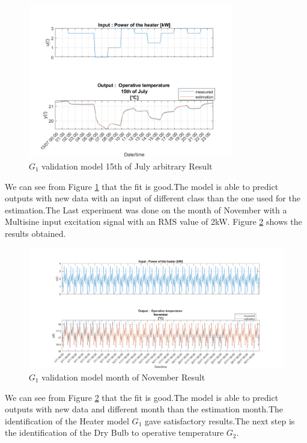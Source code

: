 \documentclass[a4paper,12pt]{report}
\numberwithin{equation}{section}
\begin{document}
\begin{figure}[H]
    \includegraphics[scale=0.8,width=0.8\textwidth]{G1_15_07_RanIn.png}
    \centering
    \caption{$G_{1}$ validation model 15th of July arbitrary Result}
    \label{fig:G1onedayValidation15/07Ran}
\end{figure}

\noindent
We can see from Figure \ref{fig:G1onedayValidation15/07Ran} that the fit is good.The model is able to predict outputs with new data with an input of different class than the one used for the estimation.The Last experiment was  done on the month of November with a Multisine input excitation signal with an RMS value of 2kW. Figure \ref{fig:G1onedayValidationNov} shows the results obtained.

\begin{figure}[H]
    \includegraphics[width=\textwidth]{G1_val_NOV.png}
    \centering
    \caption{$G_{1}$ validation model month of November  Result}
    \label{fig:G1onedayValidationNov}
\end{figure}

\noindent
We can see from Figure \ref{fig:G1onedayValidationNov} that the fit is good.The model is able to predict outputs with new data and different month than the estimation month.The identification of the Heater model $G_{1}$ gave satisfactory results.The next step is the identification of the Dry Bulb to operative temperature $G_{2}$.
\end{document}
